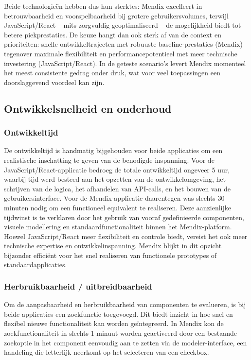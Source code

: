 Beide technologieën hebben dus hun sterktes: Mendix excelleert in betrouwbaarheid en voorspelbaarheid bij grotere gebruikersvolumes, terwijl JavaScript/React – mits zorgvuldig geoptimaliseerd – de mogelijkheid biedt tot betere piekprestaties. De keuze hangt dan ook sterk af van de context en prioriteiten: snelle ontwikkeltrajecten met robuuste baseline-prestaties (Mendix) tegenover maximale flexibiliteit en performancepotentieel met meer technische investering (JavaScript/React). In de geteste scenario’s levert Mendix momenteel het meest consistente gedrag onder druk, wat voor veel toepassingen een doorslaggevend voordeel kan zijn.


\subsection{Ontwikkelsnelheid en onderhoud}

\subsubsection{Ontwikkeltijd}
De ontwikkeltijd is handmatig bijgehouden voor beide applicaties om een realistische inschatting te geven van de benodigde inspanning. Voor de JavaScript/React-applicatie bedroeg de totale ontwikkeltijd ongeveer 5 uur, waarbij tijd werd besteed aan het opzetten van de ontwikkelomgeving, het schrijven van de logica, het afhandelen van \gls{API}-calls, en het bouwen van de gebruikersinterface. Voor de Mendix-applicatie daarentegen was slechts 30 minuten nodig om een functioneel equivalent te realiseren. Deze aanzienlijke tijdwinst is te verklaren door het gebruik van vooraf gedefinieerde componenten, visuele modellering en standaardfunctionaliteit binnen het Mendix-platform. Hoewel JavaScript/React meer flexibiliteit en controle biedt, vereist het ook meer technische expertise en ontwikkelinspanning. Mendix blijkt in dit opzicht bijzonder efficiënt voor het snel realiseren van functionele prototypes of standaardapplicaties.

\subsubsection{Herbruikbaarheid / uitbreidbaarheid}
Om de aanpasbaarheid en herbruikbaarheid van componenten te evalueren, is bij beide applicaties een zoekfunctie toegevoegd. Dit biedt inzicht in hoe snel en flexibel nieuwe functionaliteit kan worden geïntegreerd. In Mendix kon de zoekfunctionaliteit in slechts 1 minuut worden geactiveerd door een bestaande zoekoptie in het component eenvoudig aan te zetten via de modeler-interface, een handeling die letterlijk neerkomt op het selecteren van een checkbox. 

